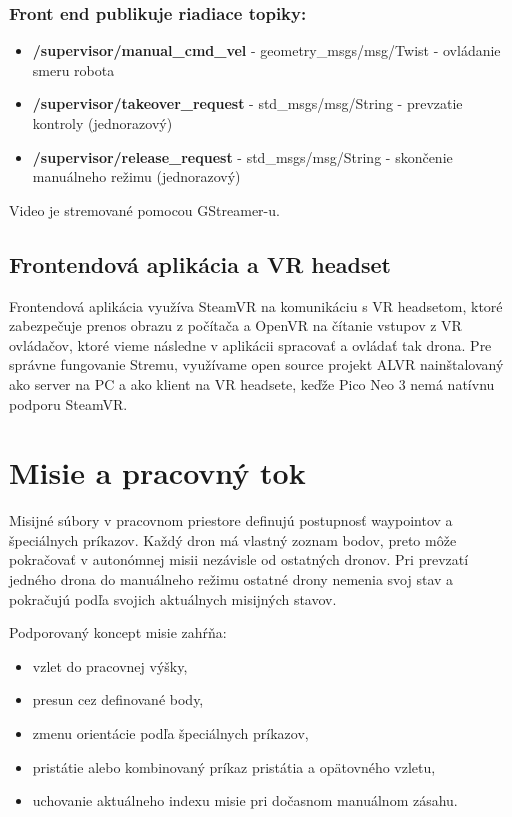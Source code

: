 \documentclass[a4paper,12pt]{article}
\begin{document}
\subsubsection*{Front end publikuje riadiace topiky:}

\begin{itemize}
    \item \textbf{/supervisor/manual\_cmd\_vel} - geometry\_msgs/msg/Twist - ovládanie smeru robota
    \item \textbf{/supervisor/takeover\_request} - std\_msgs/msg/String - prevzatie kontroly (jednorazový)
    \item \textbf{/supervisor/release\_request} - std\_msgs/msg/String - skončenie manuálneho režimu (jednorazový)

\end{itemize}

Video je stremované pomocou GStreamer-u. 

\subsection{Frontendová aplikácia a VR headset}

Frontendová aplikácia využíva SteamVR na komunikáciu s VR headsetom, ktoré zabezpečuje prenos obrazu z počítača
a OpenVR na čítanie vstupov z VR ovládačov, ktoré vieme následne v aplikácii spracovať a ovládať tak drona. 
Pre správne fungovanie Stremu, využívame open source projekt ALVR nainštalovaný ako server na PC a ako klient na VR headsete, keďže Pico Neo 3 nemá natívnu podporu SteamVR. 

\newpage
\section{Misie a pracovný tok}

Misijné súbory v pracovnom priestore definujú postupnosť waypointov a špeciálnych príkazov. Každý dron má vlastný zoznam bodov, preto môže pokračovať v autonómnej misii nezávisle od ostatných dronov. Pri prevzatí jedného drona do manuálneho režimu ostatné drony nemenia svoj stav a pokračujú podľa svojich aktuálnych misijných stavov.

Podporovaný koncept misie zahŕňa:

\begin{itemize}
    \item vzlet do pracovnej výšky,
    \item presun cez definované body,
    \item zmenu orientácie podľa špeciálnych príkazov,
    \item pristátie alebo kombinovaný príkaz pristátia a opätovného vzletu,
    \item uchovanie aktuálneho indexu misie pri dočasnom manuálnom zásahu.
\end{itemize}
\end{document}
